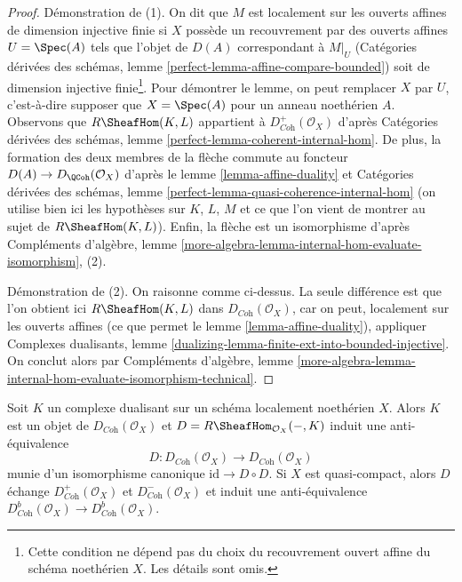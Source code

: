 \begin{proof}
Démonstration de (1). On dit que $M$ est localement sur les ouverts affines de dimension injective finie si $X$ possède un recouvrement par des ouverts affines $U = \Spec(A)$ tels que l'objet de $D(A)$ correspondant à $M|_U$ (Catégories dérivées des schémas, lemme \ref{perfect-lemma-affine-compare-bounded}) soit de dimension injective finie\footnote{Cette condition ne dépend pas du choix du recouvrement ouvert affine du schéma noethérien $X$. Les détails sont omis.}. Pour démontrer le lemme, on peut remplacer $X$ par $U$, c'est-à-dire supposer que $X = \Spec(A)$ pour un anneau noethérien $A$. Observons que $R\SheafHom(K, L)$ appartient à $D^+_{\textit{Coh}}(\mathcal{O}_X)$ d'après Catégories dérivées des schémas, lemme \ref{perfect-lemma-coherent-internal-hom}. De plus, la formation des deux membres de la flèche commute au foncteur $D(A) \to D_\QCoh(\mathcal{O}_X)$ d'après le lemme \ref{lemma-affine-duality} et Catégories dérivées des schémas, lemme \ref{perfect-lemma-quasi-coherence-internal-hom} (on utilise bien ici les hypothèses sur $K$, $L$, $M$ et ce que l'on vient de montrer au sujet de $R\SheafHom(K, L)$). Enfin, la flèche est un isomorphisme d'après Compléments d'algèbre, lemme \ref{more-algebra-lemma-internal-hom-evaluate-isomorphism}, (2).

\medskip\noindent
Démonstration de (2). On raisonne comme ci-dessus. La seule différence est que l'on obtient ici $R\SheafHom(K, L)$ dans $D_{\textit{Coh}}(\mathcal{O}_X)$, car on peut, localement sur les ouverts affines (ce que permet le lemme \ref{lemma-affine-duality}), appliquer Complexes dualisants, lemme \ref{dualizing-lemma-finite-ext-into-bounded-injective}. On conclut alors par Compléments d'algèbre, lemme \ref{more-algebra-lemma-internal-hom-evaluate-isomorphism-technical}.
\end{proof}

\begin{lemma}
\label{lemma-dualizing-schemes}
Soit $K$ un complexe dualisant sur un schéma localement noethérien $X$. Alors $K$ est un objet de $D_{\textit{Coh}}(\mathcal{O}_X)$ et $D = R\SheafHom_{\mathcal{O}_X}(-, K)$ induit une anti-équivalence
$$
D :
D_{\textit{Coh}}(\mathcal{O}_X)
\longrightarrow
D_{\textit{Coh}}(\mathcal{O}_X)
$$
munie d'un isomorphisme canonique $\text{id} \to D \circ D$. Si $X$ est quasi-compact, alors $D$ échange $D^+_{\textit{Coh}}(\mathcal{O}_X)$ et $D^-_{\textit{Coh}}(\mathcal{O}_X)$ et induit une anti-équivalence $D^b_{\textit{Coh}}(\mathcal{O}_X) \to D^b_{\textit{Coh}}(\mathcal{O}_X)$.
\end{lemma}

